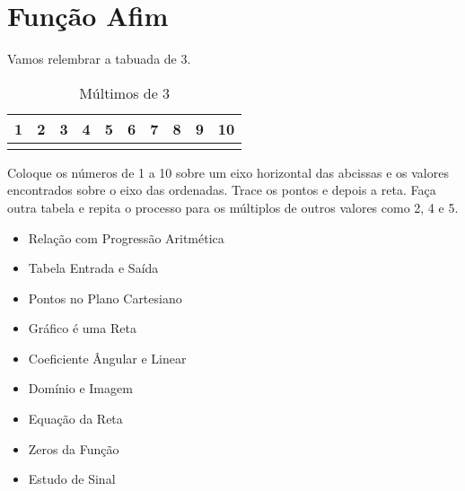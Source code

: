 \chapter{Função Afim}
Vamos relembrar a tabuada de 3.


\begin{table}[h]
\begin{center}
 \begin{tabular}{|c|c|c|c|c|c|c|c|c|c|}
 \hline
 1 & 2 & 3 & 4 & 5 & 6 & 7 & 8 & 9 & 10 \\
 \hline
 & & & & & & & & & \\
 \hline
 \end{tabular}
 \end{center}
 \caption{Múltimos de 3}
 \label{tab:my_label}
\end{table}

Coloque os números de 1 a 10 sobre um eixo horizontal das abcissas e os valores encontrados sobre o eixo das ordenadas. Trace os pontos e depois a reta. Faça outra tabela e repita o processo para os múltiplos de outros valores como 2, 4 e 5.

\begin{itemize}
 \item Relação com Progressão Aritmética
 \item Tabela Entrada e Saída
 \item Pontos no Plano Cartesiano
 \item Gráfico é uma Reta
 \item Coeficiente Ângular e Linear
 \item Domínio e Imagem
 \item Equação da Reta
 \item Zeros da Função
 \item Estudo de Sinal
\end{itemize}


